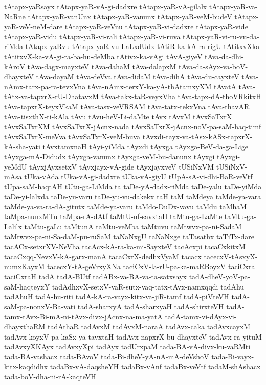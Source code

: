 {tAtapx-yaRsayx
tAtapx-yaR-vA-gi-dadxre
tAtapx-yaR-vA-gilalx
tAtapx-yaR-va-NaRne
tAtapx-yaR-vanUnx
tAtapx-yaR-vanunx
tAtapx-yaR-veM-budeV
tAtapx-yaR-veV-neM-dare
tAtapx-yaR-veVnu
tAtapx-yaR-vi-dadxre
tAtapx-yaR-vide
tAtapx-yaR-vidu
tAtapx-yaR-vi-rali
tAtapx-yaR-vi-ruva
tAtapx-yaR-vi-ru-vu-da-riMda
tAtapx-yaRvu
tAtapx-yaR-vu-LaLxdUdx
tAtiR-ka-kA-ra-rigU
tAtitxvXka
tAtitxvX-ka-vA-gi-ra-ba-hu-deMba
tAtivx-ka-vAgi
tAvA-giyeV
tAva-da-dhi-kAroV
tAva-dagx-mayxteV
tAva-dahaM
tAva-dalapxM
tAva-da-sAyx-va-boV-dhayxteV
tAva-dayaM
tAva-deVva
tAva-didaM
tAva-dihA
tAva-du-cayxteV
tAva-nAmx-tarx-pa-ra-tevxVna
tAva-nAmx-terxY-ka-yA-thAtamxyXM
tAvatA
tAva-tAtx-va-tapxrX-rU-DhatavxM
tAva-takx-taR-veyxVha
tAva-tapx-dA-thoVRkitxH
tAva-tapxrX-teyxVkaM
tAva-tasx-veVRSAM
tAva-tatx-tekxVna
tAva-thavAR
tAva-tisxthX-ti-kAla
tAvu
tAvu-heV-Li-daMte
tAvx
tAvxM
tAvxSaTxrX
tAvxSaTxrXM
tAvxSaTxrX-jAcnx-nada
tAvxSaTxrX-jAcnx-noV-pa-saM-haq-timf
tAvxSaTxrX-meVva
tAvxSaTxrX-veM-buva
tAvxdi-tayx-va-tAsx-kASx-tapxrX-kA-sha-yati
tAvxtamxnaH
tAyi-yiMda
tAyxdi
tAyxga
tAyxga-BeV-da-ga-Lige
tAyxga-mA-Didudx
tAyxga-vanunx
tAyxga-veM-bu-danunx
tAyxgi
tAyxgi-yeMdU
tAyxjAyxsetxV
tAyxjayx-vA-gide
tAyxjayxveV
tUSiNxVM
tUSiNxV-mAsa
tUka-vAda
tUka-vA-gi-dadxre
tUka-vA-giyU
tUpA-sA-vi-dhi-BaR-veVtf
tUpa-saM-haqtAH
tUtu-ga-LiMda
ta
taDe-yA-dadx-riMda
taDe-yalu
taDe-yiMda
taDe-yi-lalxda
taDe-yu-varu
taDe-yu-vu-dakekx
taH
taM
taMdeya
taMde-ya-vara
taMde-ya-va-ra-dA-gitutx
taMde-ya-varu
taMdo-DuDx-vavu
taMdu
taMhaM
taMpa-nunxMTu
taMpa-rA-dAtf
taMtU-nf-savxtaH
taMtu-ga-LaMte
taMtu-ga-Lalilx
taMtu-gaLu
taMtunA
taMtu-veMba
taMtuvu
taMtwvx-pa-ni-SadaM
taMtwvx-pa-ni-Sa-daM-pu-ruSaM
taNaNxgU
taNaNxge
taTasathx
taTiTx-dare
tacACx-setxrXV-NeVha
tacAcx-kA-ra-ka-mi-SayxteV
tacAcxpi
tacaCxkitxM
tacaCxqq-NevxV-kA-garx-manA
tacaCxrX-dedhxVyaM
tacacx
tacecxV-tAsxyX-numxKayxM
tacecxY-tA-geVrxyXNa
taciCxV-la-rU-pa-ka-maRBoyxV
taciCxra
taciCxraH
tadA
tadA-BUtf
tadABx-va-BA-va-ta-satxsayx
tadA-dheV-yoV-pa-saM-haqteyxY
tadAdhxvX-setxV-vaR-sutx-vaq-tatx-tAvx-namxqqdi
tadAhu
tadAhuH
tadA-hu-riti
tadA-kA-ra-vayx-kitx-va-jiR-tamf
tadA-piVteVH
tadA-saM-pa-nonxV-Ba-vati
tadA-sharxyA
tadA-sharxyaH
tadA-shirxteVH
tadA-tamx-tAvx-Bi-mA-ni-tAvx-divx-jAcnx-na-ma-yatA
tadA-tamx-vi-dAyx-vi-dhayxthaRM
tadAthaR
tadAvxM
tadAvxM-naraA
tadAvx-caka
tadAvxcayxM
tadAvx-koyxV-pa-kaSx-ya-tavxtaH
tadAvx-napxrX-bu-dhayxteV
tadAvx-ra-yituM
tadAvxyXKAyx
tadAvxyXpi
tadAyx
tadUrxpaM
tada-BA-vA-divx-ku-vaRMti
tada-BA-vashacx
tada-BAvoV
tada-Bi-dheV-yA-nA-mA-deVshoV
tada-Bi-vayx-kitx-kaqdidhx
tadaBx-vA-daqsheYH
tadaBx-vAnf
tadaBx-veVtf
tadaM-shAshacx
tada-boV-dha-ni-rA-kaqteVH
}
